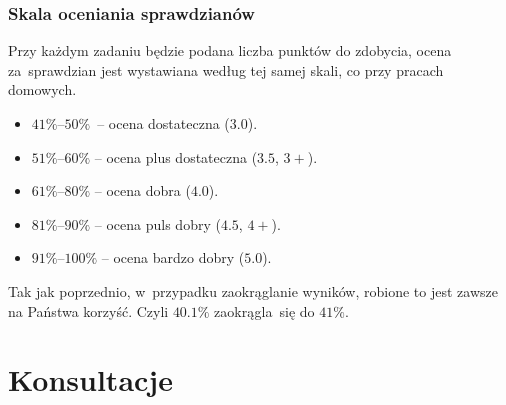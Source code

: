 \documentclass[10pt,t]{beamer}
\begin{document}
\begin{frame}
  \frametitle{Skala oceniania sprawdzianów}


  Przy każdym zadaniu będzie podana liczba punktów do zdobycia, ocena
  za~sprawdzian jest wystawiana według tej samej skali, co przy pracach
  domowych.

  \vspace{-0.3em}



  \begin{itemize}

  \item $41\%\text{--}50\%$~-- ocena dostateczna ($3.0$).

  \item $51\%\text{--}60\%$ -- ocena plus dostateczna ($3.5$, $3+$).

  \item $61\%\text{--}80\%$ -- ocena dobra ($4.0$).

  \item $81\%\text{--}90\%$ -- ocena puls dobry ($4.5$, $4+$).

  \item $91\%\text{--}100\%$ -- ocena bardzo dobry ($5.0$).

  \end{itemize}

  \vspace{-0.3em}



  Tak jak poprzednio, w~przypadku zaokrąglanie wyników, robione to jest
  zawsze na Państwa korzyść. Czyli $40.1\%$ zaokrągla~się do $41\%$.

\end{frame}










\section{Konsultacje}
\end{document}
